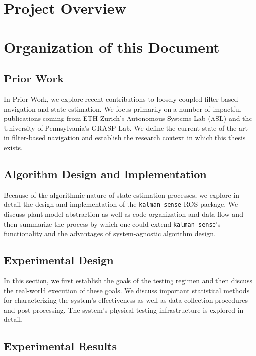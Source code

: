 \section{Project Overview}


\section{Organization of this Document}

\subsection*{Prior Work}

In Prior Work, we explore recent contributions to loosely coupled filter-based navigation and state estimation. We focus primarily on a number of impactful publications coming from ETH Zurich's Autonomous Systems Lab (ASL) and the University of Pennsylvania's GRASP Lab. We define the current state of the art in filter-based navigation and establish the research context in which this thesis exists.

\subsection*{Algorithm Design and Implementation}

Because of the algorithmic nature of state estimation processes, we explore in detail the design and implementation of the \texttt{kalman\_sense} ROS package. We discuss plant model abstraction as well as code organization and data flow and then summarize the process by which one could extend \texttt{kalman\_sense}'s functionality and the advantages of system-agnostic algorithm design.

\subsection*{Experimental Design}

In this section, we first establish the goals of the testing regimen and then discuss the real-world execution of these goals. We discuss important statistical methods for characterizing the system's effectiveness as well as data collection procedures and post-processing. The system's physical testing infrastructure is explored in detail.

\subsection*{Experimental Results}

